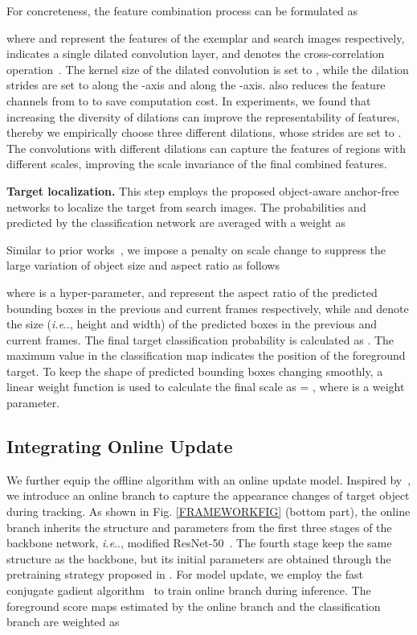 \documentclass[runningheads]{llncs}
\makeatletter
\DeclareRobustCommand\onedot{\futurelet\@let@token\@onedot}
\def\@onedot{\ifx\@let@token.\else.\null\fi\xspace}
\def\ie{\emph{i.e}\onedot} \def\Ie{\emph{I.e}\onedot}
\makeatother
\begin{document}
For concreteness, the feature combination process can be formulated as 

where  and  represent the features of the exemplar and search images respectively,  indicates a single dilated convolution layer, and  denotes the cross-correlation operation~\cite{siamFC}. The  kernel size of the dilated convolution  is set to , while the dilation strides are set to  along the -axis and  along the -axis.  also reduces the feature channels from  to  to save computation cost. In experiments, we found that increasing the diversity of dilations can improve the representability of features, thereby we empirically choose three different dilations, whose strides are set to . The convolutions with different dilations can capture the features of regions with different scales, improving the scale invariance of the final combined features.



\textbf{Target localization.} This step employs the proposed object-aware anchor-free networks to localize the target from search images. The probabilities  and  predicted by the classification network are averaged with a weight  as

Similar to prior works~\cite{siamFC,SiamRPN++}, we impose a penalty on scale change to suppress the large variation of object size and aspect ratio as follows

where  is a hyper-parameter,  and  represent the aspect ratio of the predicted bounding boxes in the previous and current frames respectively, while  and  denote the size (\ie, height and width) of the predicted boxes in the previous and current frames. The final target classification probability  is calculated as . The maximum value in the classification map  indicates the position of the foreground target. To keep the shape of predicted bounding boxes changing smoothly, a linear weight function is used to calculate the final scale as  = , where  is a weight parameter.


\vspace{-0.5em}
\subsection{Integrating Online Update}
\label{Sec4.2}


We further equip the offline algorithm with an online update model. Inspired by~\cite{DiMP,ATOM}, we introduce an online branch to capture the appearance changes of target object during tracking. As shown in Fig. \ref{FRAMEWORKFIG} (bottom part), the online branch inherits the structure and parameters from the first three stages of the backbone network, \ie, modified ResNet-50~\cite{ResNet}. The fourth stage keep the same structure as the backbone, but its initial parameters are obtained through the pretraining strategy proposed in \cite{DiMP}. For model update, we employ the fast conjugate gadient algorithm~\cite{DiMP} to train online branch during inference. The foreground score maps estimated by the online branch and the classification branch are weighted as
\end{document}
